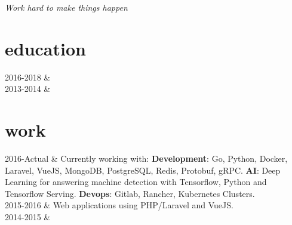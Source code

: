 \documentclass[]{cv-mauri}
\begin{document}

\textit{Work hard to make things happen}

\section*{education}
\begin{tabularcv}
    2016-2018   &   
                    \\[\vspacepar] %
    2013-2014   &   
\end{tabularcv}

\section*{work}
\begin{tabularcv}
    2016-Actual   &   
                    \newline 
                    Currently working with: \newline
                    \textbf{Development}: Go, Python, Docker, Laravel, VueJS, MongoDB, PostgreSQL, Redis, Protobuf, gRPC. \newline
                    \textbf{AI}: Deep Learning for answering machine detection with Tensorflow, Python and Tensorflow Serving. \newline
                    \textbf{Devops}: Gitlab, Rancher, Kubernetes Clusters.
                    \\[\vspacepar]
    2015-2016   &   
                    \newline Web applications using PHP/Laravel and VueJS.
                    \\[\vspacepar]
	2014-2015   &   
\end{tabularcv}
\end{document}
